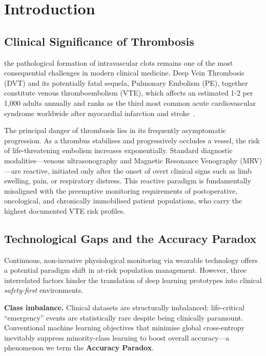 \documentclass[conference]{IEEEtran}
\begin{document}
\section{Introduction}

\subsection{Clinical Significance of Thrombosis}
 the pathological formation of
intravascular clots remains one of the most consequential
challenges in modern clinical medicine.  Deep Vein Thrombosis (DVT)
and its potentially fatal sequela, Pulmonary Embolism (PE), together
constitute venous thromboembolism (VTE), which affects an estimated
1-2 per 1{,}000 adults annually and ranks as the third most common
acute cardiovascular syndrome worldwide after myocardial infarction
and stroke~\cite{b16}.

The principal danger of thrombosis lies in its frequently
asymptomatic progression.  As a thrombus stabilises and progressively
occludes a vessel, the risk of life-threatening embolism increases
exponentially.  Standard diagnostic modalities---venous ultrasonography
and Magnetic Resonance Venography (MRV)---are reactive, initiated only
after the onset of overt clinical signs such as limb swelling, pain, or
respiratory distress.  This reactive paradigm is fundamentally
misaligned with the preemptive monitoring requirements of postoperative,
oncological, and chronically immobilised patient populations, who carry
the highest documented VTE risk profiles.

\subsection{Technological Gaps and the Accuracy Paradox}
Continuous, non-invasive physiological monitoring via wearable
technology offers a potential paradigm shift in at-risk population
management.  However, three interrelated factors hinder the translation
of deep learning prototypes into clinical \textit{safety-first}
environments.

\textbf{Class imbalance.}  Clinical datasets are structurally
imbalanced: life-critical ``emergency'' events are statistically
rare despite being clinically paramount.  Conventional machine learning
objectives that minimise global cross-entropy inevitably suppress
minority-class learning to boost overall accuracy---a phenomenon we
term the \textbf{Accuracy Paradox}.
\end{document}
